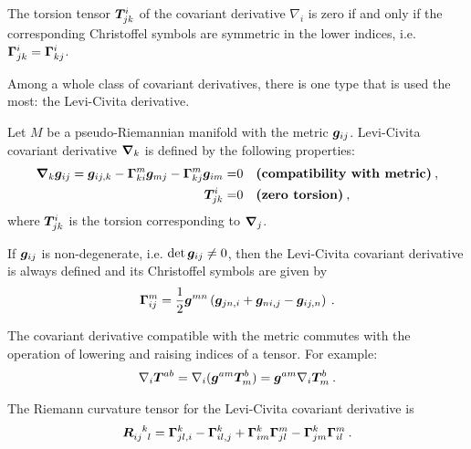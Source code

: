 \begin{proposition}
    The torsion tensor $\boldsymbol{T}^i_{jk}$ of the covariant derivative $\nabla_i$ is zero if and only if the corresponding Christoffel symbols are symmetric in the lower indices, i.e. $\boldsymbol{\Gamma}^i_{jk} = \boldsymbol{\Gamma}^i_{kj}$.
\end{proposition}

Among a whole class of covariant derivatives, there is one type that is used the most: the Levi-Civita derivative.

\begin{definition}
    Let $M$ be a pseudo-Riemannian manifold with the metric $\boldsymbol{g}_{ij}$. Levi-Civita covariant derivative $\boldsymbol{\nabla}_k$ is defined by the following properties:
    \begin{align}
        \boldsymbol{\nabla}_k \boldsymbol{g}_{ij} = \boldsymbol{g}_{ij,k} - \boldsymbol{\Gamma}^m_{ki} \boldsymbol{g}_{mj} - \boldsymbol{\Gamma}^m_{kj} \boldsymbol{g}_{im}  =& 0 \quad \textbf{(compatibility with metric)} \:, \\
        \boldsymbol{T}^{i}_{jk} =& 0 \quad \textbf{(zero torsion)} \:,
    \end{align}
    where $\boldsymbol{T}^i_{jk}$ is the torsion corresponding to $\boldsymbol{\nabla}_j$.
\end{definition}

If $\boldsymbol{g}_{ij}$ is non-degenerate, i.e. $\det \boldsymbol{g}_{ij} \neq 0$, then the Levi-Civita covariant derivative is always defined and its Christoffel symbols are given by
\begin{align}
    \boldsymbol{\Gamma}^m_{ij} =\frac{1}{2} \boldsymbol{g}^{mn} \left( \boldsymbol{g}_{jn,i} + \boldsymbol{g}_{ni,j} - \boldsymbol{g}_{ij,n} \right) \:. \label{eq:Levi-Civita-gamma}
\end{align}

The covariant derivative compatible with the metric commutes with the operation of lowering and raising indices of a tensor. For example:
\begin{align}
    \nabla_i \boldsymbol{T}^{ab} = \nabla_i (\boldsymbol{g}^{am} \boldsymbol{T}^b_m) = \boldsymbol{g}^{am} \nabla_i \boldsymbol{T}^b_m \:.
\end{align}

The Riemann curvature tensor for the Levi-Civita covariant derivative is
\begin{align}
    \vc R\indices{_i_j^k_l} = \vc \Gamma^k_{jl,i} - \vc \Gamma^k_{il,j} + \vc \Gamma^k_{im} \vc \Gamma^m_{jl} - \vc \Gamma^k_{jm} \vc \Gamma^m_{il} \:.
\end{align}

